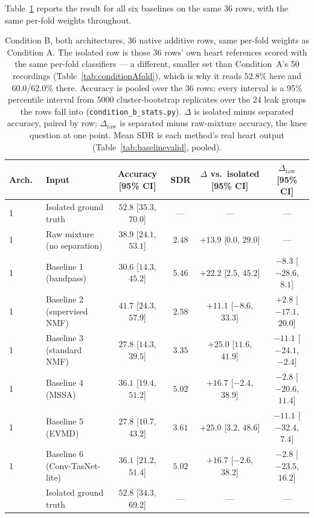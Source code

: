 \documentclass[11pt]{article}
\begin{document}
Table~\ref{tab:conditionb} reports the result for all six baselines on
the same 36 rows, with the same per-fold weights throughout.

\begin{table}[H]
\centering
\caption{Condition B, both architectures, 36 native additive rows, same per-fold weights as Condition A. The isolated row is those 36 rows' own heart references scored with the same per-fold classifiers --- a different, smaller set than Condition~A's 50 recordings (Table~\ref{tab:conditionAfold}), which is why it reads $52.8\%$ here and $60.0$/$62.0\%$ there. Accuracy is pooled over the 36 rows; every interval is a 95\% percentile interval from 5000 cluster-bootstrap replicates over the 24 leak groups the rows fall into (\texttt{condition\_b\_stats.py}). $\Delta$ is isolated minus separated accuracy, paired by row; $\Delta_{\text{raw}}$ is separated minus raw-mixture accuracy, the knee question at one point. Mean SDR is each method's real heart output (Table~\ref{tab:baselinevalid}, pooled).}
\label{tab:conditionb}
\small
\begin{tabular}{@{}llcccc@{}}
\toprule
Arch.\ & Input & Accuracy [95\% CI] & SDR & $\Delta$ vs.\ isolated [95\% CI] & $\Delta_{\text{raw}}$ [95\% CI] \\
\midrule
1 & Isolated ground truth & $52.8$ [$35.3$, $70.0$] & --- & --- & --- \\
1 & Raw mixture (no separation) & $38.9$ [$24.1$, $53.1$] & $2.48$ & $+13.9$ [$0.0$, $29.0$] & --- \\
1 & Baseline 1 (bandpass) & $30.6$ [$14.3$, $45.2$] & $5.46$ & $+22.2$ [$2.5$, $45.2$] & $-8.3$ [$-28.6$, $8.1$] \\
1 & Baseline 2 (supervised NMF) & $41.7$ [$24.3$, $57.9$] & $2.58$ & $+11.1$ [$-8.6$, $33.3$] & $+2.8$ [$-17.1$, $20.0$] \\
1 & Baseline 3 (standard NMF) & $27.8$ [$14.3$, $39.5$] & $3.35$ & $+25.0$ [$11.6$, $41.9$] & $-11.1$ [$-24.1$, $-2.4$] \\
1 & Baseline 4 (MSSA) & $36.1$ [$19.4$, $51.2$] & $5.02$ & $+16.7$ [$-2.4$, $38.9$] & $-2.8$ [$-20.6$, $11.4$] \\
1 & Baseline 5 (EVMD) & $27.8$ [$10.7$, $43.2$] & $3.61$ & $+25.0$ [$3.2$, $48.6$] & $-11.1$ [$-32.4$, $7.4$] \\
1 & Baseline 6 (Conv-TasNet-lite) & $36.1$ [$21.2$, $51.4$] & $5.02$ & $+16.7$ [$-2.6$, $38.2$] & $-2.8$ [$-23.5$, $16.2$] \\
\addlinespace
2 & Isolated ground truth & $52.8$ [$34.3$, $69.2$] & --- & --- & --- \\

\end{tabular}
\end{table}
\end{document}
